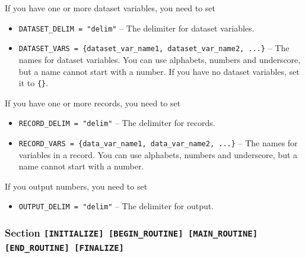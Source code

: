 \documentclass[12pt]{article}
\begin{document}
If you have one or more dataset variables, you need to set
\begin{itemize}
 \item \verb|DATASET_DELIM = "delim"| -- The delimiter for dataset variables.
 \item \verb|DATASET_VARS = {dataset_var_name1, dataset_var_name2, ...}| -- The names for dataset variables. You can use alphabets, numbers and underscore, but a name cannot start with a number. If you have no dataset variables, set it to \verb|{}|.
\end{itemize}
If you have one or more records, you need to set
\begin{itemize}
 \item \verb|RECORD_DELIM = "delim"| -- The delimiter for records.
 \item \verb|RECORD_VARS = {data_var_name1, data_var_name2, ...}| -- The names for variables in a record. You can use alphabets, numbers and underscore, but a name cannot start with a number.
\end{itemize}

If you output numbers, you need to set
\begin{itemize}
 \item \verb|OUTPUT_DELIM = "delim"| -- The delimiter for output.
\end{itemize}

\subsubsection*{Section \tt [INITIALIZE] [BEGIN\_ROUTINE]
[MAIN\_ROUTINE] [END\_ROUTINE] [FINALIZE]}
\end{document}
